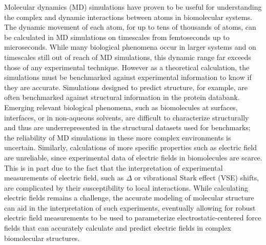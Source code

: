 Molecular dynamics (MD) simulations have proven to be useful for understanding the complex and dynamic interactions between atoms in biomolecular systems. 
The dynamic movement of each atom, for up to tens of thousands of atoms, can be calculated in MD simulations on timescales from femtoseconds up to microseconds. 
While many biological phenomena occur in larger systems and on timescales still out of reach of MD simulations, this dynamic range far exceeds those of any experimental technique. 
However as a theoretical calculation, the simulations must be benchmarked against experimental information to know if they are accurate. 
Simulations designed to predict structure, for example, are often benchmarked against structural information in the protein databank.
Emerging relevant biological phenomena, such as biomolecules at surfaces, interfaces, or in non-aqueous solvents, are difficult to characterize structurally and thus are underrepresented in the structural datasets used for benchmarks;
the reliability of MD simulations in these more complex environments is uncertain. 
Similarly, calculations of more specific properties such as electric field are unreliable, since experimental data of electric fields in biomolecules are scarce. 
This is in part due to the fact that the interpretation of experimental measurements of electric field, such as $\Delta$\pKa{} or vibrational Stark effect (VSE) shifts, are complicated by their susceptibility to local interactions. 
While calculating electric fields remains a challenge, the accurate modeling of molecular structure can aid in the interpretation of such experiments, eventually allowing for robust electric field measurements to be used to parameterize electrostatic-centered force fields that can accurately calculate and predict electric fields in complex biomolecular structures. 

